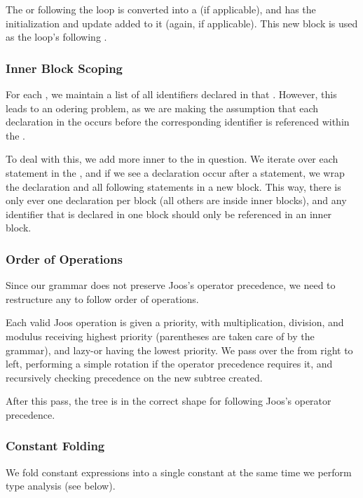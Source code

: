 \documentclass[pdftex,11pt,a4paper]{article}
\begin{document}
The  or  following the  loop is converted
into a  (if applicable), and has the initialization and update
added to it (again, if applicable). This new block is used as the 
loop's following .

\subsubsection{Inner Block Scoping}

For each , we maintain a list of all identifiers declared in
that . However, this leads to an odering problem, as we are making
the assumption that each declaration in the  occurs before the
corresponding identifier is referenced within the .

To deal with this, we add more inner  to the  in
question. We iterate over each statement in the , and if we see a
declaration occur after a statement, we wrap the declaration and all following
statements in a new block. This way, there is only ever one declaration per
block (all others are inside inner blocks), and any identifier that is
declared in one block should only be referenced in an inner block.

\subsubsection{Order of Operations}

Since our grammar does not preserve Joos's operator precedence, we need to
restructure any  to follow order of operations.

Each valid Joos operation is given a priority, with multiplication, division,
and modulus receiving highest priority (parentheses are taken care of by the
grammar), and lazy-or having the lowest priority. We pass over the
 from right to left, performing a simple rotation if
the operator precedence requires it, and recursively checking precedence on the
new subtree created.

After this pass, the  tree is in the correct shape for
following Joos's operator precedence.

\subsubsection{Constant Folding}

We fold constant expressions into a single constant at the same time we perform
type analysis (see below).
\end{document}
